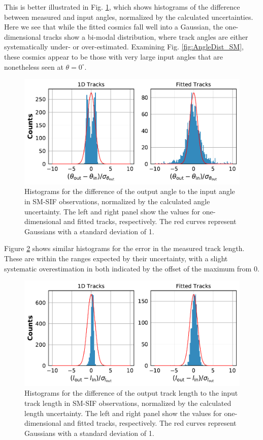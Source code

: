 \documentclass[a4paper, 11pt]{article}
\begin{document}
This is better illustrated in Fig. \ref{fig:AngleErr_SM}, which shows histograms of the difference between measured and input angles, normalized by the calculated uncertainties. Here we see that while the fitted cosmics fall well into a Gaussian, the one-dimensional tracks show a bi-modal distribution, where track angles are either systematically under- or over-estimated. Examining Fig. \ref{fig:AngleDist_SM}, these cosmics appear to be those with very large input angles that are nonetheless seen at $\theta = 0^\circ$.

\begin{figure}[!h]
  \centering
  \includegraphics[width=\textwidth]{images/postprocessing/AngleErr_SM}
  \caption{Histograms for the difference of the output angle to the input angle in SM-SIF observations, normalized by the calculated angle uncertainty. The left and right panel show the values for one-dimensional and fitted tracks, respectively. The red curves represent Gaussians with a standard deviation of 1.}
  \label{fig:AngleErr_SM}
\end{figure}

Figure \ref{fig:LenErr_SM} shows similar histograms for the error in the measured track length. These are within the ranges expected by their uncertainty, with a slight systematic overestimation in both indicated by the offset of the maximum from 0.

\begin{figure}[!h]
  \centering
  \includegraphics[width=\textwidth]{images/postprocessing/LenErr_SM}
  \caption{Histograms for the difference of the output track length to the input track length in SM-SIF observations, normalized by the calculated length uncertainty. The left and right panel show the values for one-dimensional and fitted tracks, respectively. The red curves represent Gaussians with a standard deviation of 1.}
  \label{fig:LenErr_SM}
\end{figure}
\end{document}
